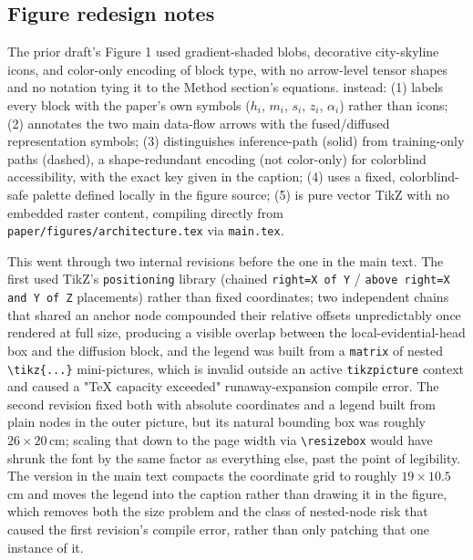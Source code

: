 \subsection{Figure redesign notes}
\label{app:figure-redesign}

The prior draft's Figure 1 used gradient-shaded blobs, decorative city-skyline icons, and
color-only encoding of block type, with no arrow-level tensor shapes and no notation tying it to
the Method section's equations.  instead: (1) labels every block with the
paper's own symbols ($h_i$, $m_i$, $s_i$, $z_i$, $\alpha_i$) rather than icons; (2) annotates the
two main data-flow arrows with the fused/diffused representation symbols; (3) distinguishes
inference-path (solid) from training-only paths (dashed), a shape-redundant encoding (not
color-only) for colorblind accessibility, with the exact key given in the caption; (4) uses a
fixed, colorblind-safe palette defined locally in the figure source; (5) is pure vector TikZ with
no embedded raster content, compiling directly from \texttt{paper/figures/architecture.tex} via
\texttt{main.tex}.

This went through two internal revisions before the one in the main text. The first used
TikZ's \texttt{positioning} library (chained \texttt{right=X of Y} / \texttt{above right=X and Y
of Z} placements) rather than fixed coordinates; two independent chains that shared an anchor
node compounded their relative offsets unpredictably once rendered at full size, producing a
visible overlap between the local-evidential-head box and the diffusion block, and the legend
was built from a \texttt{matrix} of nested \texttt{\textbackslash tikz\{...\}} mini-pictures,
which is invalid outside an active \texttt{tikzpicture} context and caused a
"TeX capacity exceeded" runaway-expansion compile error. The second revision fixed both with
absolute coordinates and a legend built from plain nodes in the outer picture, but its natural
bounding box was roughly $26\times20$\,cm; scaling that down to the page width via
\texttt{\textbackslash resizebox} would have shrunk the font by the same factor as everything
else, past the point of legibility. The version in the main text compacts the coordinate grid to
roughly $19\times10.5$\,cm and moves the legend into the caption rather than drawing it in the
figure, which removes both the size problem and the class of nested-node risk that caused the
first revision's compile error, rather than only patching that one instance of it.
